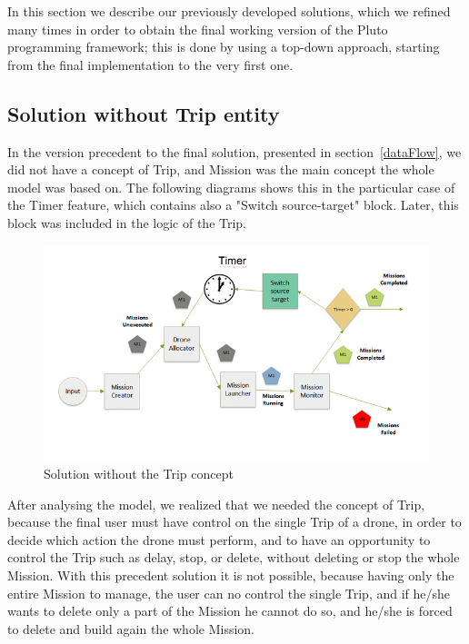 In this section we describe our previously developed solutions, which we refined many times in order to obtain the final working version of the Pluto programming framework; this is done by using a top-down approach, starting from the final implementation to the very first one.

\subsection{Solution without Trip entity}

In the version precedent to the final solution, presented in section~\ref{dataFlow}, we did not have a concept of Trip, and Mission was the main concept the whole model was based on. The following diagrams shows this in the particular case of the Timer feature, which contains also a "Switch source-target" block. Later, this block was included in the logic of the Trip.

\begin{figure}[htb]
  \centering
  \includegraphics[width=\linewidth]{pictures/NoTrip.png}
  \caption{Solution without the Trip concept}
  \label{fig:noTrip}
\end{figure}

After analysing the model, we realized that we needed the concept of Trip, because the final user must have control on the single Trip of a drone, in order to decide which action the drone must perform, and to have an opportunity to control the Trip such as delay, stop, or delete, without deleting or stop the whole Mission. With this precedent solution it is not possible, because having only the entire  Mission to manage, the user can no control the single Trip, and if he/she wants to delete only a part of the Mission he cannot do so, and he/she is forced to delete and build again the whole Mission.

